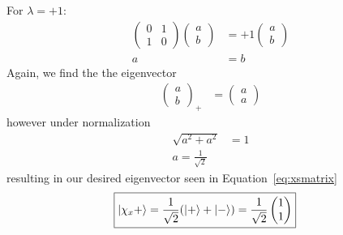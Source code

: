 \documentclass{jhwhw}
\begin{document}
For $\lambda = +1$:
 \begin{align}
 	\begin{pmatrix}
 		0	&	1	\\
 		1	&	0
 	\end{pmatrix}
 	\begin{pmatrix}
 		a	\\
 		b
 	\end{pmatrix}
 	&=
 	+1
 	\begin{pmatrix}
 		a	\\
 		b
 	\end{pmatrix}
 	\\
 	 a &= b
 \end{align}
Again, we find the the eigenvector
\begin{align}
 	\begin{pmatrix}
 		a	\\
 		b
 	\end{pmatrix}_+
 	&=
 	\begin{pmatrix}
 		a	\\
 		a
 	\end{pmatrix}
 \end{align}
 however under normalization
 \begin{align}
 	\sqrt{a^2+a^2} &= 1
	\\
	a = \frac{1}{\sqrt{2}}
 \end{align}
 resulting in our desired eigenvector seen in Equation~\eqref{eq:xsmatrix}
 \begin{align}
	 \Aboxed{
	\ket{\chi_x +} = 
	\frac{1}{\sqrt{2}}(\ket{+} + \ket{-}) = 
	\frac{1}{\sqrt{2}}
	\begin{pmatrix}
		1 \\
		1
	\end{pmatrix}}
 \end{align}
\end{document}

